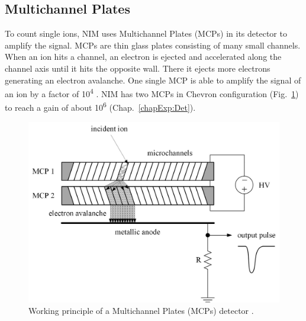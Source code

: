 	\subsection{Multichannel Plates }\label{sec:DetParam}
	To count single ions, NIM uses Multichannel Plates (MCPs) in its detector to amplify the signal. MCPs are thin glass plates consisting of many small channels. When an ion hits a channel, an electron is ejected and accelerated along the channel axis until it hits the opposite wall. There it ejects more electrons generating an electron avalanche. One single MCP is able to amplify the signal of an ion by a factor of 10\textsuperscript{4} \cite{Wiza_1979_MCP}. NIM has two MCPs in Chevron configuration (Fig.~\ref{fig:MCPPrincipleSchema}) to reach a gain of about 10\textsuperscript{6} (Chap.~\ref{chapExp:Det}).
	\begin{figure}[h]
		\centering
		\includegraphics[width=.7\textwidth]{Bilder/MCP_PrinipleSchema.jpg}
		\caption{Working principle of a Multichannel Plates (MCPs) detector \cite{Wiza_1979_MCP,Diss_Meyer}.}
		\label{fig:MCPPrincipleSchema}
	\end{figure}
	
